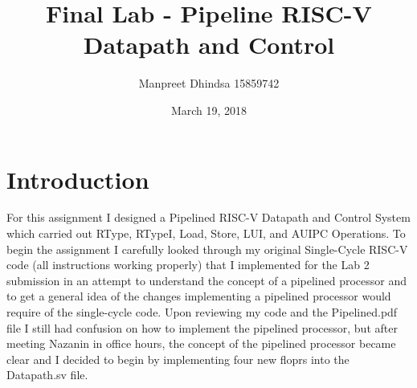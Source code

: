 \documentclass{article}
\begin{document}
\begin{titlepage}
\title{Final Lab - Pipeline RISC-V Datapath and Control}
\author{Manpreet Dhindsa		15859742}
\date{March 19, 2018}
\maketitle
\end{titlepage}

\section{Introduction}

For this assignment I designed a Pipelined RISC-V Datapath and Control System which carried out RType, RTypeI, Load, Store, LUI, and AUIPC Operations. To begin the assignment I carefully looked through my original Single-Cycle RISC-V code (all instructions working properly) that I implemented for the Lab 2 submission in an attempt to understand the concept of a pipelined processor and to get a general idea of the changes implementing a pipelined processor would require of the single-cycle code. Upon reviewing my code and the Pipelined.pdf file I still had confusion on how to implement the pipelined processor, but after meeting Nazanin in office hours, the concept of the pipelined processor became clear and I decided to begin by implementing four new floprs into the Datapath.sv file.
\end{document}
